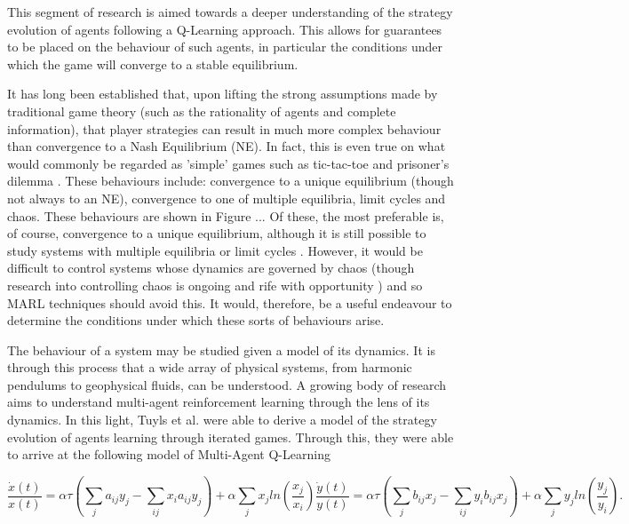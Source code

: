 \documentclass[.../main.tex]{subfiles}
\begin{document}
    This segment of research is aimed towards a deeper understanding of the strategy evolution
    of agents following a Q-Learning approach. This allows for guarantees to be placed on the
    behaviour of such agents, in particular the conditions under which the game will converge to a
    stable equilibrium.

    It has long been established that, upon lifting the strong assumptions made by traditional
    game theory (such as the rationality of agents and complete information), that player
    strategies can result in much more complex behaviour than convergence to a Nash Equilibrium 
    (NE). In fact, this is even true on what would commonly be regarded as 'simple' games such
    as tic-tac-toe and prisoner's dilemma \cite{Galla's work and I think Sato's work}. These
    behaviours include: convergence to a unique equilibrium (though not always to an NE),
    convergence to one of multiple equilibria, limit cycles and chaos. These behaviours are shown in
    Figure ... Of these, the most preferable is, of course, convergence to a unique equilibrium,
    although it is still possible to study systems with multiple equilibria or limit cycles 
    \cite{One of the textbooks}. However, it would be difficult to control systems whose dynamics
    are governed by chaos (though research into controlling chaos is ongoing and rife with
    opportunity \cite{CyberneticalPhysics}) and so MARL techniques should avoid this. It would,
    therefore, be a useful endeavour to determine the conditions under which these sorts of
    behaviours arise.

    The behaviour of a system may be studied given a model of its dynamics. It is through this
    process that a wide array of physical systems, from harmonic pendulums to geophysical fluids,
    can be understood. A growing body of research aims to understand multi-agent reinforcement
    learning through the lens of its dynamics. In this light, Tuyls et al. \cite{Tuyls2006AnGames}
    were able to derive a model of the strategy evolution of agents learning through iterated games.
    Through this, they were able to arrive at the following model of Multi-Agent Q-Learning

	\begin{subequations}
	\label{eqn::EOM}
		\begin{equation}
			\frac{\dot{x}(t)}{x(t)} = \alpha \tau (\sum_{j} a_{ij} y_j - \sum_{i j} x_i a_{ij} y_j)
			+ \alpha \sum_j x_j ln(\frac{x_j}{x_i}) 
		\end{equation}
		\begin{equation}
			\frac{\dot{y}(t)}{y(t)} = \alpha \tau (\sum_{j} b_{ij} x_j - \sum_{i j} y_i b_{ij} x_j)
			+ \alpha \sum_j y_j ln(\frac{y_j}{y_i}).
		\end{equation}
	\end{subequations}
\end{document}
